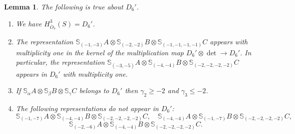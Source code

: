 \documentclass[11pt,reqno]{amsart}
\newcommand{\oo}{\otimes}
\newcommand{\bS}{\mathbb{S}}
\renewcommand{\det}{\operatorname{det}}
\newcommand{\ol}[1]{\overline{#1}}
\newtheorem{lemma}[theorem]{Lemma}
\numberwithin{equation}{section}
\begin{document}
\begin{lemma}\label{lem:D6primeisH3}
The following is true about $D_6'$.
\begin{enumerate}
\item We have $H^3_{\ol{O}_7}(S)=D_6'$.
\item The representation $\bS_{(-1,-3)}A\oo \bS_{(-2,-2)}B\oo \bS_{(-1,-1,-1,-1)}C$ appears with multiplicity one in the kernel of the multiplication map $D_6'\oo \det\to D_6'$. In particular, the representation $\bS_{(-3,-5)}A\oo \bS_{(-4,-4)}B\oo \bS_{(-2,-2,-2,-2)}C$ appears in $D_6'$ with multiplicity one.
\item If $\bS_{\alpha}A\oo \bS_{\beta}B\oo \bS_{\gamma}C$ belongs to $D_6'$ then $\gamma_2\geq -2$ and $\gamma_3\leq -2$.
\item The following representations do not appear in $D_6'$: 
$$
\bS_{(-1,-7)}A\oo \bS_{(-4,-4)}B\oo \bS_{(-2,-2,-2,-2)}C, \quad \bS_{(-4,-4)}A\oo \bS_{(-1,-7)}B\oo \bS_{(-2,-2,-2,-2)}C,
$$
$$
\bS_{(-2,-6)}A\oo \bS_{(-4,-4)}B\oo \bS_{(-2,-2,-2,-2)}C.
$$
\end{enumerate}
\end{lemma}
\end{document}
